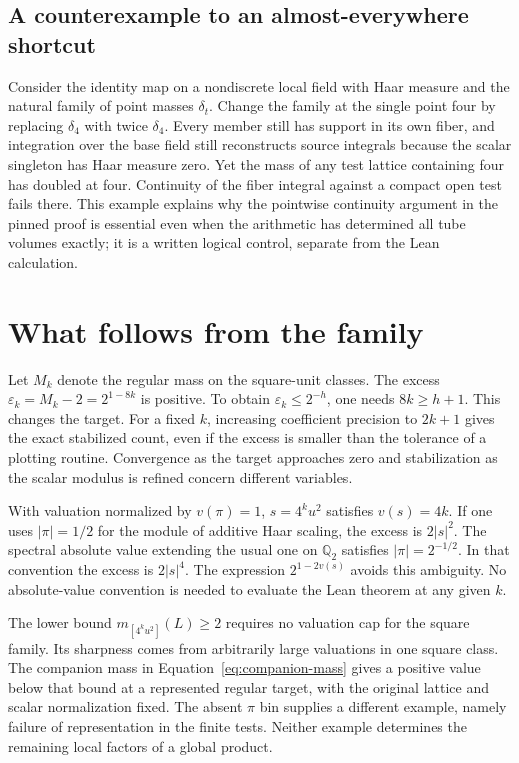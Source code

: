 \documentclass[12pt,letterpaper]{article}
\begin{document}
\subsection{A counterexample to an almost-everywhere shortcut}
Consider the identity map on a nondiscrete local field with Haar measure and the natural family of point masses $\delta_t$. Change the family at the single point four by replacing $\delta_4$ with twice $\delta_4$. Every member still has support in its own fiber, and integration over the base field still reconstructs source integrals because the scalar singleton has Haar measure zero. Yet the mass of any test lattice containing four has doubled at four. Continuity of the fiber integral against a compact open test fails there. This example explains why the pointwise continuity argument in the pinned proof is essential even when the arithmetic has determined all tube volumes exactly; it is a written logical control, separate from the Lean calculation.
\section{What follows from the family}
Let $M_k$ denote the regular mass on the square-unit classes. The excess $\varepsilon_k=M_k-2=2^{1-8k}$ is positive. To obtain $\varepsilon_k\le2^{-h}$, one needs $8k\ge h+1$. This changes the target. For a fixed $k$, increasing coefficient precision to $2k+1$ gives the exact stabilized count, even if the excess is smaller than the tolerance of a plotting routine. Convergence as the target approaches zero and stabilization as the scalar modulus is refined concern different variables.

With valuation normalized by $v(\pi)=1$, $s=4^ku^2$ satisfies $v(s)=4k$. If one uses $|\pi|=1/2$ for the module of additive Haar scaling, the excess is $2|s|^2$. The spectral absolute value extending the usual one on $\mathbb Q_2$ satisfies $|\pi|=2^{-1/2}$. In that convention the excess is $2|s|^4$. The expression $2^{1-2v(s)}$ avoids this ambiguity. No absolute-value convention is needed to evaluate the Lean theorem at any given $k$.

The lower bound $m_{[4^ku^2]}(L)\ge2$ requires no valuation cap for the square family. Its sharpness comes from arbitrarily large valuations in one square class. The companion mass in Equation~\eqref{eq:companion-mass} gives a positive value below that bound at a represented regular target, with the original lattice and scalar normalization fixed. The absent $\pi$ bin supplies a different example, namely failure of representation in the finite tests. Neither example determines the remaining local factors of a global product.
\end{document}
